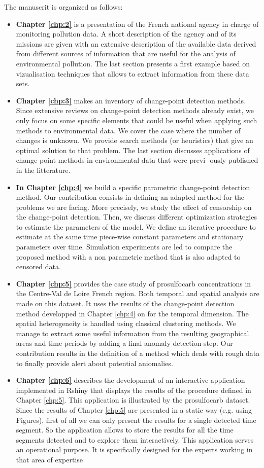 The manuscrit is organized as follows:
\begin{itemize}
\item{\textbf{Chapter \ref{chp:2}}} is a presentation of the French national agency in charge of monitoring pollution data. A short description of the agency and of its missions are given with an extensive description of the available data derived from different sources of information that are useful for the analysis of environmental pollution. The last section presents a first example based on vizualisation techniques that allows to extract information from these data sets.
\item{\textbf{Chapter \ref{chp:3}}} makes an inventory of change-point detection methods. Since extensive reviews on change-point detection methods already exist, we only focus on some specific elements that could be useful when applying such methods to environmental data. We cover the case where the number of changes is unknown. We provide search methods (or heuristics) that give an optimal solution to that problem. The last section discusses applications of change-point methods in environmental data that were previ- ously published in the litterature.
\item{\textbf{In Chapter \ref{chp:4}}} we build a specific parametric change-point detection method. Our contribution consists in defining an adapted method for the problems we are facing. More precisely, we study the effect of censorship on the change-point detection. Then, we discuss different optimization strategies to estimate the parameters of the model. We define an iterative procedure to estimate at the same time piece-wise constant parameters and stationary parameters over time. Simulation experiments are led to compare the proposed method with a non parametric method that is also adapted to censored data.
\item{\textbf{Chapter \ref{chp:5}}} provides the case study of prosulfocarb concentrations in the Centre-Val de Loire French region. Both temporal and spatial analysis are made on this dataset. It uses the results of the change-point detection method developped in Chapter \ref{chp:4} on for the temporal dimension. 
The spatial heterogeneity is handled using classical clustering methods. We manage to extract some useful information from the resulting geographical areas and time periods by adding a final anomaly detection step. Our contribution results in the definition of a method which deals with rough data to finally provide alert about potential aniomalies. 
\item{\textbf{Chapter \ref{chp:6}}} describes the development of an interactive application implemented in Rshiny that displays the results of the procedure defined in Chapter \ref{chp:5}. This application is illustrated by the prosulfocarb dataset. Since the results of Chapter \ref{chp:5} are presented in a static way (e.g. using Figures), first of all we can only present the results for a single detected time segment. So the application allows to store the results for all the time segments detected and to explore them interactively. This application serves an operational purpose. It is specifically designed for the experts working in that area of expertise
\end{itemize}

